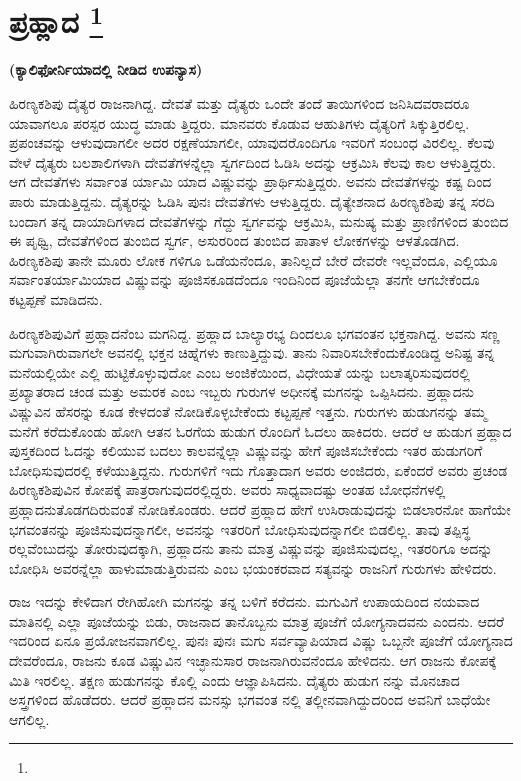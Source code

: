 
\chapter[ಪ್ರಹ್ಲಾದ]{ಪ್ರಹ್ಲಾದ \protect\footnote{}}

\centerline{\textbf{(ಕ್ಯಾಲಿಫೋರ್ನಿಯಾದಲ್ಲಿ ನೀಡಿದ ಉಪನ್ಯಾಸ)}}

ಹಿರಣ್ಯಕಶಿಪು ದೈತ್ಯರ ರಾಜನಾಗಿದ್ದ. ದೇವತೆ ಮತ್ತು ದೈತ್ಯರು ಒಂದೇ ತಂದೆ ತಾಯಿಗಳಿಂದ ಜನಿಸಿದವರಾದರೂ ಯಾವಾಗಲೂ ಪರಸ್ಪರ ಯುದ್ಧ ಮಾಡು ತ್ತಿದ್ದರು. ಮಾನವರು ಕೊಡುವ ಆಹುತಿಗಳು ದೈತ್ಯರಿಗೆ ಸಿಕ್ಕುತ್ತಿರಲಿಲ್ಲ. ಪ್ರಪಂಚವನ್ನು ಆಳುವುದಾಗಲೀ ಅದರ ರಕ್ಷಣೆಯಾಗಲೀ, ಯಾವುದರೊಂದಿಗೂ ಇವರಿಗೆ ಸಂಬಂಧ ವಿರಲಿಲ್ಲ. ಕೆಲವು ವೇಳೆ ದೈತ್ಯರು ಬಲಶಾಲಿಗಳಾಗಿ ದೇವತೆಗಳನ್ನೆಲ್ಲಾ ಸ್ವರ್ಗದಿಂದ ಓಡಿಸಿ ಅದನ್ನು ಆಕ್ರಮಿಸಿ ಕೆಲವು ಕಾಲ ಆಳುತ್ತಿದ್ದರು. ಆಗ ದೇವತೆಗಳು ಸರ್ವಾಂತ ರ್ಯಾಮಿ ಯಾದ ವಿಷ್ಣುವನ್ನು ಪ್ರಾರ್ಥಿಸುತ್ತಿದ್ದರು. ಅವನು ದೇವತೆಗಳನ್ನು ಕಷ್ಟ ದಿಂದ ಪಾರು ಮಾಡುತ್ತಿದ್ದನು. ದೈತ್ಯರನ್ನು ಓಡಿಸಿ ಪುನಃ ದೇವತೆಗಳು ಆಳುತ್ತಿದ್ದರು. ದೈತ್ಯೇಶನಾದ ಹಿರಣ್ಯಕಶಿಪು ತನ್ನ ಸರದಿ ಬಂದಾಗ ತನ್ನ ದಾಯಾದಿಗಳಾದ ದೇವತೆಗಳನ್ನು ಗೆದ್ದು ಸ್ವರ್ಗವನ್ನು ಆಕ್ರಮಿಸಿ, ಮನುಷ್ಯ ಮತ್ತು ಪ್ರಾಣಿಗಳಿಂದ ತುಂಬಿದ ಈ ಪೃಥ್ವಿ, ದೇವತೆಗಳಿಂದ ತುಂಬಿದ ಸ್ವರ್ಗ, ಅಸುರರಿಂದ ತುಂಬಿದ ಪಾತಾಳ ಲೋಕಗಳನ್ನು ಆಳತೊಡಗಿದ. ಹಿರಣ್ಯಕಶಿಪು ತಾನೇ ಮೂರು ಲೋಕ ಗಳಿಗೂ ಒಡೆಯನೆಂದೂ, ತಾನಿಲ್ಲದೆ ಬೇರೆ ದೇವರೇ ಇಲ್ಲವೆಂದೂ, ಎಲ್ಲಿಯೂ ಸರ್ವಾಂತರ್ಯಾಮಿಯಾದ ವಿಷ್ಣುವನ್ನು ಪೂಜಿಸಕೂಡದೆಂದೂ ಇಂದಿನಿಂದ ಪೂಜೆಯೆಲ್ಲಾ ತನಗೇ ಆಗಬೇಕೆಂದೂ ಕಟ್ಟಪ್ಪಣೆ ಮಾಡಿದನು.

ಹಿರಣ್ಯಕಶಿಪುವಿಗೆ ಪ್ರಹ್ಲಾದನೆಂಬ ಮಗನಿದ್ದ. ಪ್ರಹ್ಲಾದ ಬಾಲ್ಯಾರಭ್ಯ ದಿಂದಲೂ ಭಗವಂತನ ಭಕ್ತನಾಗಿದ್ದ. ಅವನು ಸಣ್ಣ ಮಗುವಾಗಿರುವಾಗಲೇ ಅವನಲ್ಲಿ ಭಕ್ತನ ಚಿಹ್ನೆಗಳು ಕಾಣುತ್ತಿದ್ದುವು. ತಾನು ನಿವಾರಿಸಬೇಕೆಂದುಕೊಂಡಿದ್ದ ಅನಿಷ್ಟ ತನ್ನ ಮನೆಯಲ್ಲಿಯೇ ಎಲ್ಲಿ ಹುಟ್ಟಿಕೊಳ್ಳುವುದೋ ಎಂಬ ಅಂಜಿಕೆಯಿಂದ, ವಿಧೇಯತೆ ಯನ್ನು ಬಲಾತ್ಕರಿಸುವುದರಲ್ಲಿ ಪ್ರಖ್ಯಾತರಾದ ಚಂಡ ಮತ್ತು ಅಮರಕ ಎಂಬ ಇಬ್ಬರು ಗುರುಗಳ ಅಧೀನಕ್ಕೆ ಮಗನನ್ನು ಒಪ್ಪಿಸಿದನು. ಪ್ರಹ್ಲಾದನು ವಿಷ್ಣುವಿನ ಹೆಸರನ್ನು ಕೂಡ ಕೇಳದಂತೆ ನೋಡಿಕೊಳ್ಳಬೇಕೆಂದು ಕಟ್ಟಪ್ಪಣೆ ಇತ್ತನು. ಗುರುಗಳು ಹುಡುಗನನ್ನು ತಮ್ಮ ಮನೆಗೆ ಕರೆದುಕೊಂಡು ಹೋಗಿ ಆತನ ಓರಗೆಯ ಹುಡುಗ ರೊಂದಿಗೆ ಓದಲು ಹಾಕಿದರು. ಆದರೆ ಆ ಹುಡುಗ ಪ್ರಹ್ಲಾದ ಪುಸ್ತಕದಿಂದ ಓದನ್ನು ಕಲಿಯುವ ಬದಲು ಕಾಲವನ್ನೆಲ್ಲಾ ವಿಷ್ಣುವನ್ನು ಹೇಗೆ ಪೂಜಿಸಬೇಕೆಂದು ಇತರ ಹುಡುಗರಿಗೆ ಬೋಧಿಸುವುದರಲ್ಲಿ ಕಳೆಯುತ್ತಿದ್ದನು. ಗುರುಗಳಿಗೆ ಇದು ಗೊತ್ತಾದಾಗ ಅವರು ಅಂಜಿದರು, ಏಕೆಂದರೆ ಅವರು ಪ್ರಚಂಡ ಹಿರಣ್ಯಕಶಿಪುವಿನ ಕೋಪಕ್ಕೆ ಪಾತ್ರರಾಗುವುದರಲ್ಲಿದ್ದರು. ಅವರು ಸಾಧ್ಯವಾದಷ್ಟು ಅಂತಹ ಬೋಧನೆಗಳಲ್ಲಿ ಪ್ರಹ್ಲಾದನು\break ತೊಡಗದಿರುವಂತೆ ನೋಡಿಕೊಂಡರು. ಆದರೆ ಪ್ರಹ್ಲಾದ ಹೇಗೆ ಉಸಿರಾಡುವುದನ್ನು ಬಿಡಲಾರನೋ ಹಾಗೆಯೇ ಭಗವಂತನನ್ನು ಪೂಜಿಸುವುದನ್ನಾಗಲೀ, ಅವನನ್ನು ಇತರರಿಗೆ ಬೋಧಿಸುವುದನ್ನಾಗಲೀ ಬಿಡಲಿಲ್ಲ. ತಾವು ತಪ್ಪಿಸ್ಥ ರಲ್ಲವೆಂಬುದನ್ನು ತೋರುವುದಕ್ಕಾಗಿ, ಪ್ರಹ್ಲಾದನು ತಾನು ಮಾತ್ರ ವಿಷ್ಣುವನ್ನು ಪೂಜಿಸುವುದಲ್ಲ, ಇತರರಿಗೂ ಅದನ್ನು ಬೋಧಿಸಿ ಅವರನ್ನೆಲ್ಲಾ ಹಾಳುಮಾಡುತ್ತಿರುವನು ಎಂಬ ಭಯಂಕರವಾದ ಸತ್ಯವನ್ನು ರಾಜನಿಗೆ ಗುರುಗಳು ಹೇಳಿದರು.

\vskip 0.3cm

ರಾಜ ಇದನ್ನು ಕೇಳಿದಾಗ ರೇಗಿಹೋಗಿ ಮಗನನ್ನು ತನ್ನ ಬಳಿಗೆ ಕರೆದನು. ಮಗುವಿಗೆ ಉಪಾಯದಿಂದ ನಯವಾದ ಮಾತಿನಲ್ಲಿ ಎಲ್ಲಾ ಪೂಜೆಯನ್ನು ಬಿಡು, ರಾಜನಾದ ತಾನೊಬ್ಬನು ಮಾತ್ರ ಪೂಜೆಗೆ ಯೋಗ್ಯನಾದವನು ಎಂದನು. ಆದರೆ ಇದರಿಂದ ಏನೂ ಪ್ರಯೋಜನವಾಗಲಿಲ್ಲ. ಪುನಃ ಪುನಃ ಮಗು ಸರ್ವವ್ಯಾಪಿಯಾದ ವಿಷ್ಣು ಒಬ್ಬನೇ ಪೂಜೆಗೆ ಯೋಗ್ಯನಾದ ದೇವರೆಂದೂ, ರಾಜನು ಕೂಡ ವಿಷ್ಣುವಿನ ಇಚ್ಛಾನುಸಾರ ರಾಜನಾಗಿರುವನೆಂದೂ ಹೇಳಿದನು. ಆಗ ರಾಜನು ಕೋಪಕ್ಕೆ ಮಿತಿ ಇರಲಿಲ್ಲ. ತಕ್ಷಣ ಹುಡುಗನನ್ನು ಕೊಲ್ಲಿ ಎಂದು ಆಜ್ಞಾಪಿಸಿದನು. ದೈತ್ಯರು ಹುಡುಗ ನನ್ನು ಮೊನಚಾದ ಅಸ್ತ್ರಗಳಿಂದ ಹೊಡೆದರು. ಆದರೆ ಪ್ರಹ್ಲಾದನ ಮನಸ್ಸು ಭಗವಂತ ನಲ್ಲಿ ತಲ್ಲೀನವಾಗಿದ್ದುದರಿಂದ ಅವನಿಗೆ ಬಾಧೆಯೇ ಆಗಲಿಲ್ಲ.

